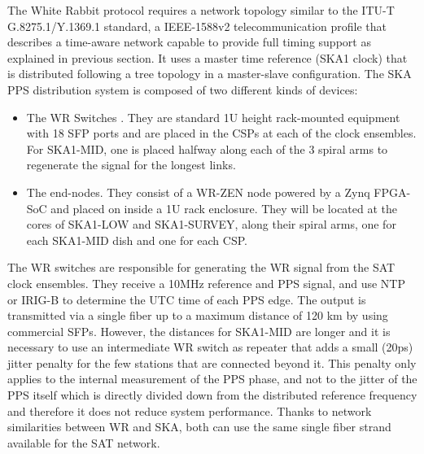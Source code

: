 %
%

The White Rabbit protocol requires a network topology similar to the ITU-T G.8275.1/Y.1369.1 standard, a IEEE-1588v2 telecommunication profile that describes a time-aware network capable to provide full timing support \cite{itu:TG8275_1_Y_1369_1} as explained in previous section. It uses a master time reference (SKA1 clock) that is distributed following a tree topology in a master-slave configuration. The SKA PPS distribution system is composed of two different kinds of devices: 

\begin{itemize}
	\item {The WR Switches \cite{sevensols:wr_switch}. They are standard 1U height rack-mounted equipment with 18 SFP ports and are placed in the CSPs at each of the clock ensembles. For SKA1-MID, one is placed halfway along each of the 3 spiral arms to regenerate the signal for the longest links.}
	\item{The end-nodes. They consist of a WR-ZEN node \cite{sevensols:wr_zen} powered by a Zynq FPGA-SoC and placed on inside a 1U rack enclosure. They will be located at the cores of SKA1-LOW and SKA1-SURVEY, along their spiral arms, one for each SKA1-MID dish and one for each CSP.}
\end{itemize}

The WR switches are responsible for generating the WR signal from the SAT clock 
ensembles. They receive a 10MHz reference and PPS signal, and use NTP or IRIG-B 
to determine the UTC time of each PPS edge. The output is transmitted via a 
single fiber up to a maximum distance of 120 km by using commercial SFPs. 
However, the distances for SKA1-MID are longer and it is necessary to use an 
intermediate WR switch as repeater that adds a small   (20ps) jitter penalty for the few stations that are connected 
beyond it. This penalty only applies   to the internal measurement of the PPS phase, and not 
to the jitter of the PPS itself which is directly divided down from the 
distributed reference frequency and therefore it does not reduce system 
performance. Thanks to network similarities between WR and SKA, both can use 
the same single fiber strand available for the SAT network. 

